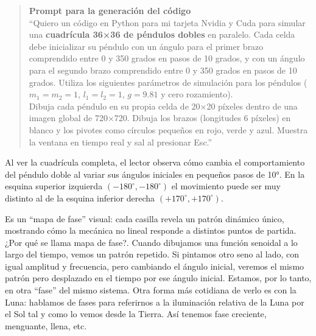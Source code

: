 \documentclass[
  10pt,
  a4paper,
  DIV=11,
  numbers=noendperiod,
  open=any]{scrreprt}
\numberwithin{equation}{chapter}
\numberwithin{equation}{section}
\renewcommand{\[}{\begin{equation}}
\renewcommand{\]}{\end{equation}}
\begin{document}
\begin{quote}
\textbf{Prompt para la generación del código}\\
``Quiero un código en Python para mi tarjeta Nvidia y Cuda para simular
una \textbf{cuadrícula 36×36 de péndulos dobles} en paralelo. Cada celda
debe inicializar su péndulo con un ángulo para el primer brazo
comprendido entre 0 y 350 grados en pasos de 10 grados, y con un ángulo
para el segundo brazo comprendido entre 0 y 350 grados en pasos de 10
grados. Utiliza los siguientes parámetros de simulación para los
péndulos (\(m_1 = m_2 = 1\), \(l_1 = l_2 = 1\), \(g = 9.81\) y cero
rozamiento).\\
Dibuja cada péndulo en su propia celda de 20×20 píxeles dentro de una
imagen global de 720×720. Dibuja los brazos (longitudes 6 píxeles) en
blanco y los pivotes como círculos pequeños en rojo, verde y azul.
Muestra la ventana en tiempo real y sal al presionar Esc.''
\end{quote}

Al ver la cuadrícula completa, el lector observa cómo cambia el
comportamiento del péndulo doble al variar sus ángulos iniciales en
pequeños pasos de 10°. En la esquina superior izquierda
\((-180^\circ,-180^\circ)\) el movimiento puede ser muy distinto al de
la esquina inferior derecha \((+170^\circ,+170^\circ)\).

Es un ``mapa de fase'' visual: cada casilla revela un patrón dinámico
único, mostrando cómo la mecánica no lineal responde a distintos puntos
de partida. ¿Por qué se llama mapa de fase?. Cuando dibujamos una
función senoidal a lo largo del tiempo, vemos un patrón repetido. Si
pintamos otro seno al lado, con igual amplitud y frecuencia, pero
cambiando el ángulo inicial, veremos el mismo patrón pero desplazado en
el tiempo por ese ángulo inicial. Estamos, por lo tanto, en otra
``fase'' del mismo sistema. Otra forma más cotidiana de verlo es con la
Luna: hablamos de fases para referirnos a la iluminación relativa de la
Luna por el Sol tal y como lo vemos desde la Tierra. Así tenemos fase
creciente, menguante, llena, etc.
\end{document}
